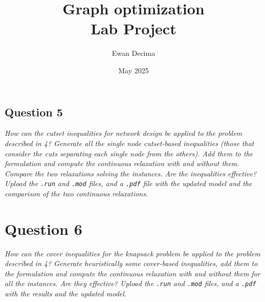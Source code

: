 \documentclass[10pt]{article}
\begin{document}
	\title{Graph optimization \\ Lab Project}
	\author{Ewan Decima}
	\date{May 2025}

	\maketitle

	\tableofcontents
	\newpage

	
	\newpage

	
	\newpage

	
	\newpage

	
	\newpage


    \subsection*{Question 5}
    \textit{How can the cutset inequalities for network design be applied to the problem described in 4? Generate all the single node cutset-based inequalities (those that consider the cuts separating each single node from the others). Add them to the formulation and compute the continuous relaxation with and without them. Compare the two relaxations solving the instances. Are the inequalities effective? Upload the \texttt{.run} and \texttt{.mod} files, and a \texttt{.pdf} file with the updated model and the comparison of the two continuous relaxations.}

    \section*{Question 6}
    \textit{How can the cover inequalities for the knapsack problem be applied to the problem described in 4? Generate heuristically some cover-based inequalities, add them to the formulation and compute the continuous relaxation with and without them for all the instances. Are they effective? Upload the \texttt{.run} and \texttt{.mod} files, and a \texttt{.pdf} with the results and the updated model.}
\end{document}
